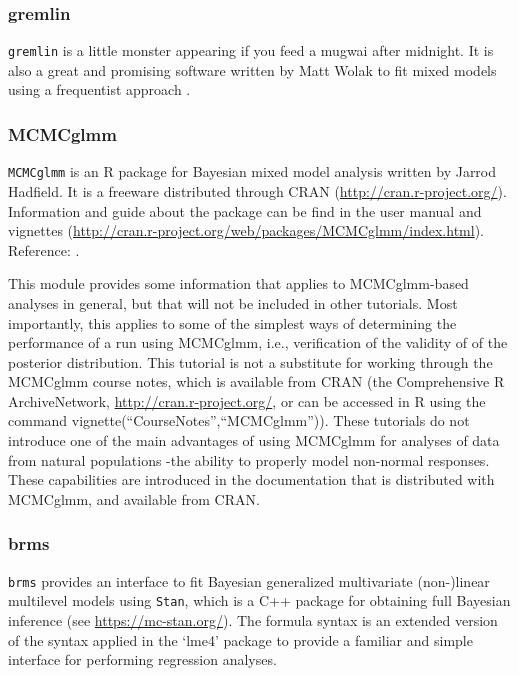\documentclass[
  12pt,
]{book}
\begin{document}
\hypertarget{gremlin}{%
\subsubsection{gremlin}\label{gremlin}}

\texttt{gremlin} is a little monster appearing if you feed a mugwai after midnight. It is also a great and promising software written by Matt Wolak to fit mixed models using a frequentist approach .

\hypertarget{mcmcglmm}{%
\subsubsection{MCMCglmm}\label{mcmcglmm}}

\texttt{MCMCglmm} is an R package for Bayesian mixed model analysis written by Jarrod Hadfield. It is a freeware distributed through CRAN (\url{http://cran.r-project.org/}). Information and guide about the package can be find in the user manual and vignettes (\url{http://cran.r-project.org/web/packages/MCMCglmm/index.html}).
Reference: \citep[\citet{R-MCMCglmm}]{MCMCglmm2010}.

This module provides some information that applies to MCMCglmm-based analyses in general, but that will not be included in other tutorials.
Most importantly, this applies to some of the simplest ways of determining the performance of a run using MCMCglmm, i.e., verification of the validity of of the posterior distribution.
This tutorial is not a substitute for working through the MCMCglmm course notes, which is available from CRAN (the Comprehensive R ArchiveNetwork, \url{http://cran.r-project.org/}, or can be accessed in R using the command vignette(``CourseNotes'',``MCMCglmm'')).
These tutorials do not introduce one of the main advantages of using MCMCglmm for analyses of data from natural populations -the ability to properly model non-normal responses.
These capabilities are introduced in the documentation that is distributed with MCMCglmm, and available from CRAN.

\hypertarget{brms}{%
\subsubsection{brms}\label{brms}}

\texttt{brms} provides an interface to fit Bayesian generalized multivariate (non-)linear multilevel models using \texttt{Stan}, which is a C++ package for obtaining full Bayesian inference (see \url{https://mc-stan.org/}).
The formula syntax is an extended version of the syntax applied in the `lme4' package to provide a familiar and simple interface for performing regression analyses.
\end{document}
